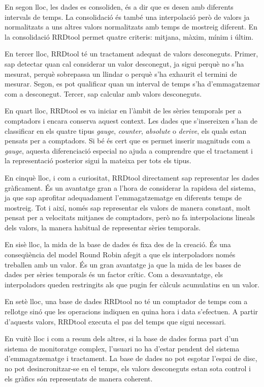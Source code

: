 En segon lloc, les dades es consoliden, és a dir que es desen amb diferents intervals de temps. La consolidació és també una interpolació però de valors ja normalitzats a uns altres valors normalitzats amb temps de mostreig diferent.
En la consolidació RRDtool permet quatre criteris: mitjana, màxim, mínim i últim.

En tercer lloc, RRDtool té un tractament adequat de valors desconeguts. Primer, sap detectar quan cal considerar un valor desconegut, ja sigui perquè no s'ha mesurat, perquè sobrepassa un llindar o perquè s'ha exhaurit el termini de mesurar.  
Segon, es pot qualificar quan un interval de temps s'ha d'emmagatzemar com a desconegut. 
Tercer, sap calcular amb valors desconeguts.


En quart lloc, RRDtool es va iniciar en l'àmbit de les sèries temporals per a comptadors i encara conserva aquest context. Les dades que s'insereixen s'han de classificar en els quatre tipus \emph{gauge}, \emph{counter}, \emph{absolute} o \emph{derive}, els quals estan pensats per a comptadors. Si bé és cert que es permet inserir magnituds com a \emph{gauge}, aquesta diferenciació especial no ajuda a comprendre que el tractament i la representació posterior sigui la mateixa per tots els tipus.


En cinquè lloc, i com a curiositat, RRDtool directament sap representar les dades gràficament. És un avantatge gran a l'hora de considerar la rapidesa del sistema, ja que sap aprofitar adequadament l'emmagatzematge en diferents temps de mostreig. Tot i així, només sap representar els valors de manera constant, molt pensat per a velocitats mitjanes de comptadors, però no fa interpolacions lineals dels valors, la manera habitual de representar sèries temporals.

En sisè lloc, la mida de la base de dades és fixa des de la creació. És una conseqüència del model Round Robin afegit a que els interpoladors només treballen amb un valor. És un gran avantatge ja que la mida de les bases de dades per sèries temporals és un factor crític. Com a desavantatge, els interpoladors queden restringits als que pugin fer càlculs acumulatius en un valor. 

En setè lloc, una base de dades RRDtool no té un comptador de temps com a rellotge sinó que les operacions indiquen en quina hora i data s'efectuen. A partir d'aquests valors, RRDtool executa el pas del temps que sigui necessari. 

En vuitè lloc i com a resum dels altres, si la base de dades forma part d'un sistema de monitoratge complex, l'usuari no ha d'estar pendent del sistema d'emmagatzematge i tractament. La base de dades no pot esgotar l'espai de disc, no pot desincronitzar-se en el temps, els valors desconeguts estan sota control i els gràfics són representats de manera coherent. 


